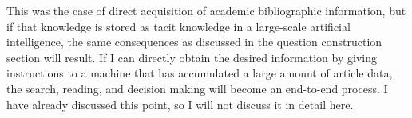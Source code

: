 \documentclass{article}
\begin{document}
This was the case of direct acquisition of academic bibliographic information, but if that knowledge is stored as tacit knowledge in a large-scale artificial intelligence, the same consequences as discussed in the question construction section will result. If I can directly obtain the desired information by giving instructions to a machine that has accumulated a large amount of article data, the search, reading, and decision making will become an end-to-end process. I have already discussed this point, so I will not discuss it in detail here.




\end{document}
